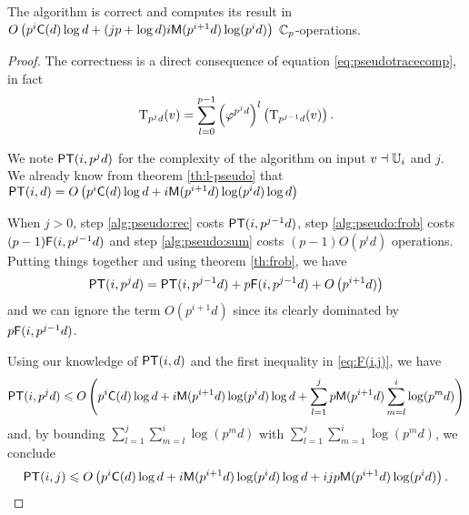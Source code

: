 \sloppy
\begin{theorem}
  \label{th:b-pseudo}
  The algorithm  is correct and computes its
  result in $O\left(p^i\mathrm{\sf C}(d)\log d + (jp+\log
  d)i\mathrm{\sf M}(p^{i+1}d)\log(p^id)\right)$ $\mathbb{C}_p$-operations.
\end{theorem}
\fussy
\begin{proof}
  The correctness is a direct consequence of equation
  \eqref{eq:pseudotracecomp}, in fact
  \begin{equation*}
    \operatorname{T}_{p^jd}(v) =
    \sum_{l=0}^{p-1}\left(\varphi^{p^jd}\right)^l\left(\operatorname{T}_{p^{j-1}d}(v)\right)
    \text{.}
  \end{equation*}
  
  We note $\mathrm{\sf PT}(i,p^jd)$ for the complexity of the algorithm on input
  $v\dashv\mathbb{U}_i$ and $j$. We already know from theorem \ref{th:l-pseudo}
  that $\mathrm{\sf PT}(i,d)=O\left(p^i\mathrm{\sf C}(d)\log d +
  i\mathrm{\sf M}(p^{i+1}d)\log(p^id)\log d\right)$
  
  When $j>0$, step \ref{alg:pseudo:rec} costs $\mathrm{\sf PT}(i,p^{j-1}d)$, step
  \ref{alg:pseudo:frob} costs $(p-1)\mathrm{\sf F}(i,p^{j-1}d)$ and step
  \ref{alg:pseudo:sum} costs $(p-1)O(p^id)$ operations. Putting things
  together and using theorem \ref{th:frob}, we have
  \begin{equation*}
    \mathrm{\sf PT}(i,p^jd) =
    \mathrm{\sf PT}(i,p^{j-1}d) + p\mathrm{\sf F}(i,p^{j-1}d) + O\left(p^{i+1}d)\right)
  \end{equation*}
  and we can ignore the term $O(p^{i+1}d)$ since its clearly dominated
  by ${p\mathrm{\sf F}(i,p^{j-1}d)}$.
  
  Using our knowledge of $\mathrm{\sf PT}(i,d)$ and the first inequality in
  \eqref{eq:F(i,j)}, we have
  \begin{equation*}
    \mathrm{\sf PT}(i,p^jd) \leqslant O\left(p^i\mathrm{\sf C}(d)\log d +
    i\mathrm{\sf M}(p^{i+1}d)\log(p^id)\log d+
    \sum_{l=1}^jp\mathrm{\sf M}(p^{i+1}d)\sum_{m=l}^i\log(p^md)\right)
  \end{equation*}
  and, by bounding $\sum_{l=1}^j \sum_{m=l}^i\log(p^md)$ with
  $\sum_{l=1}^j\sum_{m=1}^i\log(p^md)$, we conclude
  \begin{equation*}
    \mathrm{\sf PT}(i,j) \leqslant
    O\left(p^i\mathrm{\sf C}(d)\log d + i\mathrm{\sf M}(p^{i+1}d)\log(p^id)\log d +
    ijp\mathrm{\sf M}(p^{i+1}d)\log(p^id)\right) \text{.}
  \end{equation*}
\end{proof}


